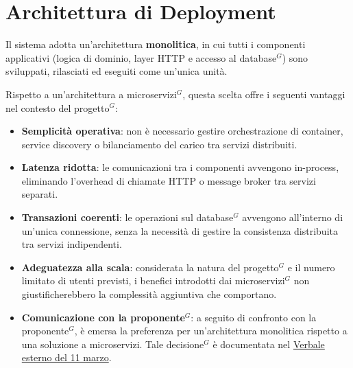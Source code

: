 \section{Architettura di Deployment}

Il sistema adotta un'architettura \textbf{monolitica}, in cui tutti i componenti applicativi (logica di dominio, layer HTTP e accesso al database$^G$) sono sviluppati, rilasciati ed eseguiti come un'unica unità.

Rispetto a un'architettura a microservizi$^G$, questa scelta offre i seguenti vantaggi nel contesto del progetto$^G$:

\begin{itemize}
	\item \textbf{Semplicità operativa}: non è necessario gestire orchestrazione di container, service discovery o bilanciamento del carico tra servizi distribuiti.
	
	\item \textbf{Latenza ridotta}: le comunicazioni tra i componenti avvengono in-process, eliminando l'overhead di chiamate HTTP o message broker tra servizi separati.
	
	\item \textbf{Transazioni coerenti}: le operazioni sul database$^G$ avvengono all'interno di un'unica connessione, senza la necessità di gestire la consistenza distribuita tra servizi indipendenti.
	
	\item \textbf{Adeguatezza alla scala}: considerata la natura del progetto$^G$ e il numero limitato di utenti previsti, i benefici introdotti dai microservizi$^G$ non giustificherebbero la complessità aggiuntiva che comportano.
	
	\item \textbf{Comunicazione con la proponente$^G$}: a seguito di confronto con la proponente$^G$, è emersa la preferenza per un'architettura monolitica rispetto a una soluzione a microservizi. Tale decisione$^G$ è documentata nel \href{https://nullpointersgroup.github.io/Documentazione/output/PB/Verbali%20Esterni/2026-03-11_verbale_esterno.pdf}{Verbale esterno del 11 marzo}.
\end{itemize}